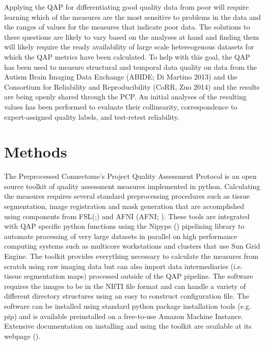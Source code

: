 Applying the QAP for differentiating good quality data from poor will require learning which of the measures are the most sensitive to problems in the data and the ranges of values for the measures that indicate poor data. The solutions to these questions are likely to vary based on the analyses at hand and finding them will likely require the ready availability of large scale hetereogenous datasets for which the QAP metrics have been calculated. To help with this goal, the QAP has been used to measure structural and temporal data quality on data from the Autism Brain Imaging Data Exchange (ABIDE; Di Martino 2013) and the Consortium for Reliability and Reproducibility (CoRR, Zuo 2014) and the results are being openly shared through the PCP. An initial analyses of the resulting values has been performed to evaluate their collinearity, correspondence to expert­-assigned quality labels, and test­-retest reliability.
\section{Methods}
\label{sec:1}
The Preprocessed Connectome’s Project Quality Assessment Protocol is an open source toolkit of quality assessment measures implemented in python. Calculating the measures requires several standard preprocessing procedures such as tissue segmentation, image registration and mask generation that are accomplished using components from FSL(;)  and AFNI (AFNI; ). These tools are integrated with QAP specific python functions using the Nipype () pipelining library to automate processing of very large datasets in parallel on high performance computing systems such as multicore workstations and clusters that use Sun Grid Engine. The toolkit provides everything necessary to calculate the measures from scratch using raw imaging data but can also import data intermediaries (i.e. tissue segmentation maps) processed outside of the QAP pipeline. The software requires the images to be in the NIfTI file format and can handle a variety of different directory structures using an easy to construct configuration file. The software can be installed using standard python package installation tools (e.g. pip) and is available preinstalled on a free-to-use Amazon Machine Instance. Extensive documentation on installing and using the toolkit are available at its webpage ().
